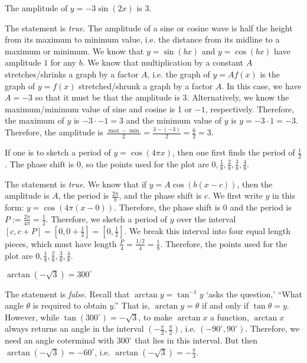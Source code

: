 \documentclass[11pt,letterpaper]{article}
\begin{document}
 The amplitude of $y= -3\sin(2x)$ is $3$.  \pspace

\sol The statement is \textit{true}. The amplitude of a sine or cosine wave is half the height from its maximum to minimum value, i.e. the distance from its midline to a maximum or minimum. We know that $y= \sin(bx)$ and $y= \cos(bx)$ have amplitude $1$ for any $b$. We know that multiplication by a constant $A$ stretches/shrinks a graph by a factor $A$, i.e. the graph of $y= Af(x)$ is the graph of $y= f(x)$ stretched/shrunk a graph by a factor $A$. In this case, we have $A= -3$ so that it must be that the amplitude is 3. Alternatively, we know the maximum/minimum value of sine and cosine is 1 or $-1$, respectively. Therefore, the maximum of $y$ is $-3 \cdot -1= 3$ and the minimum value of $y$ is $y= -3 \cdot 1= -3$. Therefore, the amplitude is $\frac{\max - \min}{2}= \frac{3 - (-3)}{2}= \frac{6}{2}= 3$. 



\newpage



 If one is to sketch a period of $y= \cos(4\pi x)$, then one first finds the period of $\frac{1}{2}$. The phase shift is 0, so the points used for the plot are $0, \frac{1}{8}, \frac{2}{8}, \frac{3}{8}, \frac{4}{8}$. \pspace

\sol The statement is \textit{true}. We know that if $y= A \cos \left( b(x - c) \right)$, then the amplitude is $A$, the period is $\frac{2\pi}{b}$, and the phase shift is $c$. We first write $y$ in this form: $y= \cos \left( 4\pi (x - 0) \right)$. Therefore, the phase shift is $0$ and the period is $P:= \frac{2\pi}{4\pi}= \frac{1}{2}$. Therefore, we sketch a period of $y$ over the interval $[c, c + P]= [0, 0 + \frac{1}{2}]= [0, \frac{1}{2}]$. We break this interval into four equal length pieces, which must have length $\frac{P}{4}= \frac{1/2}{4}= \frac{1}{8}$. Therefore, the points used for the plot are $0, \frac{1}{8}, \frac{2}{8}, \frac{3}{8}, \frac{4}{8}$. \pvspace{1.3cm}



 $\arctan(-\sqrt{3})= 300^\circ$ \pspace

\sol The statement is \textit{false}. Recall that $\arctan y= \tan^{-1} y$ `asks the question,' ``What angle $\theta$ is required to obtain $y$.'' That is, $\arctan y= \theta$ if and only if $\tan \theta= y$. However, while $\tan(300^\circ)= -\sqrt{3}$, to make $\arctan x$ a function, $\arctan x$ always returns an angle in the interval $(-\frac{\pi}{2}, \frac{\pi}{2})$, i.e. $(-90^\circ, 90^\circ)$. Therefore, we need an angle coterminal with $300^\circ$ that lies in this interval. But then $\arctan(-\sqrt{3})= -60^\circ$, i.e. $\arctan(-\sqrt{3})= -\frac{\pi}{3}$. \pvspace{1.3cm}
\end{document}
